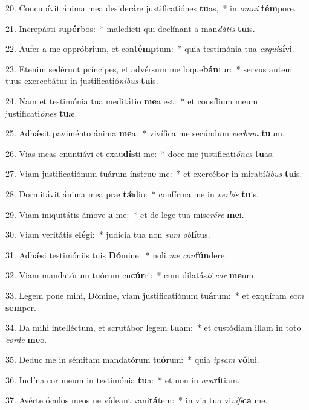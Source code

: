 20. Concupívit ánima mea desideráre justificatiónes \textbf{tu}as,~*  in \textit{om}\textit{ni} \textbf{tém}pore.\

21. Increpásti su\textbf{pér}bos:~*  maledícti qui declínant a man\textit{dá}\textit{tis} \textbf{tu}is.\

22. Aufer a me oppróbrium, et con\textbf{témp}tum:~*  quia testimónia tua \textit{ex}\textit{qui}\textbf{sí}vi.\

23. Etenim sedérunt príncipes, et advérsum me loque\textbf{bán}tur:~*  servus autem tuus exercebátur in justificatió\textit{ni}\textit{bus} \textbf{tu}is.\

24. Nam et testimónia tua meditátio \textbf{me}a est:~*  et consílium meum justificati\textit{ó}\textit{nes} \textbf{tu}æ.\

25. Adhǽsit paviménto ánima \textbf{me}a:~*  vivífica me secúndum \textit{ver}\textit{bum} \textbf{tu}um.\

26. Vias meas enuntiávi et exau\textbf{dís}ti me:~*  doce me justificati\textit{ó}\textit{nes} \textbf{tu}as.\

27. Viam justificatiónum tuárum ínstru\textbf{e} me:~*  et exercébor in mirabí\textit{li}\textit{bus} \textbf{tu}is.\

28. Dormitávit ánima mea præ \textbf{tǽ}dio:~*  confírma me in \textit{ver}\textit{bis} \textbf{tu}is.\

29. Viam iniquitátis ámove \textbf{a} me:~*  et de lege tua mise\textit{ré}\textit{re} \textbf{me}i.\

30. Viam veritátis e\textbf{lé}gi:~*  judícia tua non \textit{sum} \textit{ob}\textbf{lí}tus.\

31. Adhǽsi testimóniis tuis \textbf{Dó}mine:~*  noli \textit{me} \textit{con}\textbf{fún}dere.\

32. Viam mandatórum tuórum cu\textbf{cúr}ri:~*  cum dilatás\textit{ti} \textit{cor} \textbf{me}um.\

33. Legem pone mihi, Dómine, viam justificatiónum tu\textbf{á}rum:~*  et exquíram \textit{e}\textit{am} \textbf{sem}per.\

34. Da mihi intelléctum, et scrutábor legem \textbf{tu}am:~*  et custódiam illam in toto \textit{cor}\textit{de} \textbf{me}o.\

35. Deduc me in sémitam mandatórum tu\textbf{ó}rum:~*  quia \textit{ip}\textit{sam} \textbf{vó}lui.\

36. Inclína cor meum in testimónia \textbf{tu}a:~*  et non in \textit{a}\textit{va}\textbf{rí}tiam.\

37. Avérte óculos meos ne vídeant vani\textbf{tá}tem:~*  in via tua vi\textit{ví}\textit{fi}\textbf{ca} me.\

